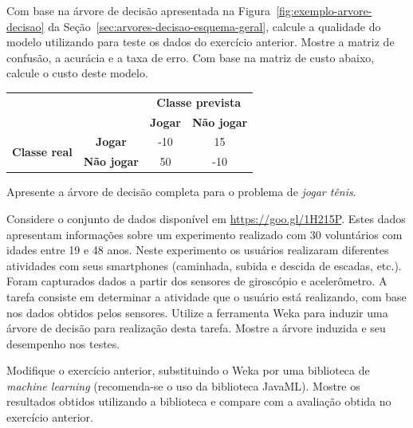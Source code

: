 \begin{exercise}
Com base na árvore de decisão apresentada na Figura~\ref{fig:exemplo-arvore-decisao} da Seção~\ref{sec:arvores-decisao-esquema-geral}, calcule a qualidade do modelo utilizando para teste os dados do exercício anterior. Mostre a matriz de confusão, a acurácia e a taxa de erro. Com base na matriz de custo abaixo, calcule o custo deste modelo.

\begin{table}[h]
	\centering
	\begin{tabular}{cc|c|c|}
		\cline{3-4}
		&                   & \multicolumn{2}{c|}{\textbf{Classe prevista}} \\ \cline{3-4} 
		&                   & \textbf{Jogar}     & \textbf{Não jogar}     \\ \hline
		\multicolumn{1}{|c|}{\multirow{2}{*}{\textbf{Classe real}}} & \textbf{Jogar} & -10           & 15           \\ \cline{2-4} 
		\multicolumn{1}{|c|}{}                                      & \textbf{Não jogar} & 50           & -10           \\ \hline
	\end{tabular}
\end{table}

\end{exercise}

\begin{exercise}
Apresente a árvore de decisão completa para o problema de \textit{jogar tênis}.
\end{exercise}

\begin{exercise}
Considere o conjunto de dados disponível em \url{https://goo.gl/1H215P}. Estes dados apresentam informações sobre um experimento realizado com 30 voluntários com idades entre 19 e 48 anos. Neste experimento os usuários realizaram diferentes atividades com seus smartphones (caminhada, subida e descida de escadas, etc.). Foram capturados dados a partir dos sensores de giroscópio e acelerômetro. A tarefa consiste em determinar a atividade que o usuário está realizando, com base nos dados obtidos pelos sensores. Utilize a ferramenta Weka para induzir uma árvore de decisão para realização desta tarefa. Mostre a árvore induzida e seu desempenho nos testes.
\end{exercise}

\begin{exercise}
Modifique o exercício anterior, substituindo o Weka por uma biblioteca de \textit{machine learning} (recomenda-se o uso da biblioteca JavaML). Mostre os resultados obtidos utilizando a biblioteca e compare com a avaliação obtida no exercício anterior.
\end{exercise}